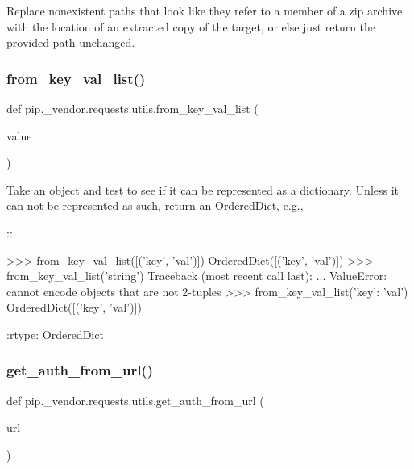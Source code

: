 \begin{DoxyVerb}Replace nonexistent paths that look like they refer to a member of a zip
archive with the location of an extracted copy of the target, or else
just return the provided path unchanged.
\end{DoxyVerb}
 \mbox{\label{namespacepip_1_1__vendor_1_1requests_1_1utils_a13a0ff7bcf06bfa0926a87ddd9e6547c}} 
\subsubsection{\texorpdfstring{from\+\_\+key\+\_\+val\+\_\+list()}{from\_key\_val\_list()}}
{\footnotesize\ttfamily def pip.\+\_\+vendor.\+requests.\+utils.\+from\+\_\+key\+\_\+val\+\_\+list (\begin{DoxyParamCaption}\item[{}]{value }\end{DoxyParamCaption})}

\begin{DoxyVerb}Take an object and test to see if it can be represented as a
dictionary. Unless it can not be represented as such, return an
OrderedDict, e.g.,

::

    >>> from_key_val_list([('key', 'val')])
    OrderedDict([('key', 'val')])
    >>> from_key_val_list('string')
    Traceback (most recent call last):
    ...
    ValueError: cannot encode objects that are not 2-tuples
    >>> from_key_val_list({'key': 'val'})
    OrderedDict([('key', 'val')])

:rtype: OrderedDict
\end{DoxyVerb}
 \mbox{\label{namespacepip_1_1__vendor_1_1requests_1_1utils_ab318ccc9d0bd3fcf05005c165a178ae2}} 
\subsubsection{\texorpdfstring{get\+\_\+auth\+\_\+from\+\_\+url()}{get\_auth\_from\_url()}}
{\footnotesize\ttfamily def pip.\+\_\+vendor.\+requests.\+utils.\+get\+\_\+auth\+\_\+from\+\_\+url (\begin{DoxyParamCaption}\item[{}]{url }\end{DoxyParamCaption})}

